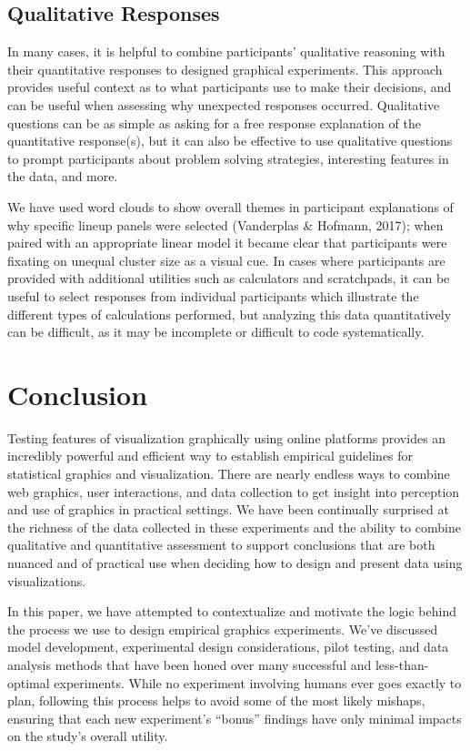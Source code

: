 \documentclass[
  10pt,
  letterpaper,
  DIV=11,
  numbers=noendperiod]{scrartcl}
\begin{document}
\subsection{Qualitative Responses}\label{qualitative-responses}

In many cases, it is helpful to combine participants' qualitative
reasoning with their quantitative responses to designed graphical
experiments. This approach provides useful context as to what
participants use to make their decisions, and can be useful when
assessing why unexpected responses occurred. Qualitative questions can
be as simple as asking for a free response explanation of the
quantitative response(s), but it can also be effective to use
qualitative questions to prompt participants about problem solving
strategies, interesting features in the data, and more.

We have used word clouds to show overall themes in participant
explanations of why specific lineup panels were selected (Vanderplas \&
Hofmann, 2017); when paired with an appropriate linear model it became
clear that participants were fixating on unequal cluster size as a
visual cue. In cases where participants are provided with additional
utilities such as calculators and scratchpads, it can be useful to
select responses from individual participants which illustrate the
different types of calculations performed, but analyzing this data
quantitatively can be difficult, as it may be incomplete or difficult to
code systematically.

\section{Conclusion}\label{conclusion}

Testing features of visualization graphically using online platforms
provides an incredibly powerful and efficient way to establish empirical
guidelines for statistical graphics and visualization. There are nearly
endless ways to combine web graphics, user interactions, and data
collection to get insight into perception and use of graphics in
practical settings. We have been continually surprised at the richness
of the data collected in these experiments and the ability to combine
qualitative and quantitative assessment to support conclusions that are
both nuanced and of practical use when deciding how to design and
present data using visualizations.

In this paper, we have attempted to contextualize and motivate the logic
behind the process we use to design empirical graphics experiments.
We've discussed model development, experimental design considerations,
pilot testing, and data analysis methods that have been honed over many
successful and less-than-optimal experiments. While no experiment
involving humans ever goes exactly to plan, following this process helps
to avoid some of the most likely mishaps, ensuring that each new
experiment's ``bonus'' findings have only minimal impacts on the study's
overall utility.
\end{document}
